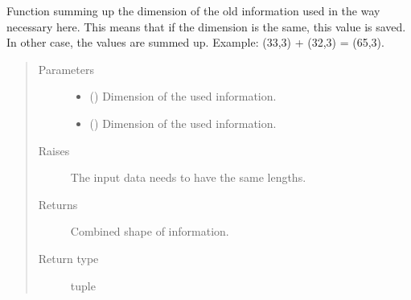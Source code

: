 \documentclass[letterpaper,10pt,english]{sphinxmanual}
\begin{document}
\begin{fulllineitems}
\label{\detokenize{index:Studienprojekt_Smolyak_qmc_one_point.sum_tuple_shape}}
Function summing up the dimension of the old information used in the way necessary here.
This means that if the dimension is the same, this value is saved. In other case, the values are summed up.
Example: (33,3) + (32,3)  = (65,3).
\begin{quote}\begin{description}
\item[{Parameters}] \leavevmode\begin{itemize}
\item {} 
 () \textendash{} Dimension of the used information.

\item {} 
 () \textendash{} Dimension of the used information.

\end{itemize}

\item[{Raises}] \leavevmode
{} \textendash{} The input data needs to have the same lengths.

\item[{Returns}] \leavevmode
Combined shape of information.

\item[{Return type}] \leavevmode
tuple

\end{description}\end{quote}

\end{fulllineitems}



\renewcommand{\indexname}{Python Module Index}
\begin{sphinxtheindex}
\let\bigletter\sphinxstyleindexlettergroup
\bigletter{s}
\item\relax{}
\end{sphinxtheindex}

\renewcommand{\indexname}{Index}
\printindex
\end{document}
